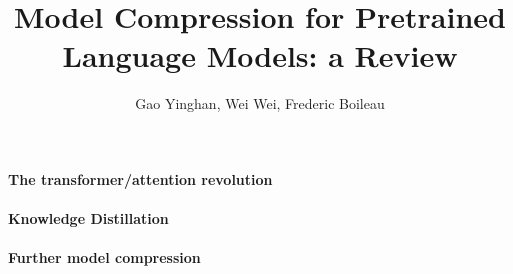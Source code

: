 \documentclass{article}
\title{\textbf{Model Compression for Pretrained Language Models: a Review}}
\author{Gao Yinghan, Wei Wei, Frederic Boileau}
\begin{document}
\maketitle
\thispagestyle{plain}

\paragraph{The transformer/attention revolution}

\paragraph{Knowledge Distillation}

\paragraph{Further model compression}



\medskip



\end{document}
